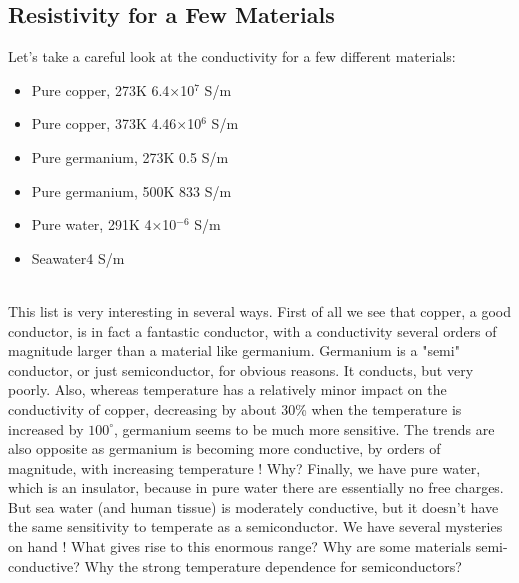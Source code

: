\subsection{Resistivity for a Few Materials}
Let's take a careful look at the conductivity for a few different materials:\\
\vspace{.5cm}
\begin{minipage}[c]{.55\textwidth}
\begin{itemize}
\item Pure copper, 273K \hfill 6.4×10$^{7}$ S/m
\item Pure copper, 373K \hfill 4.46×10$^{6}$ S/m
\item Pure germanium, 273K \hfill 0.5  S/m
\item Pure germanium, 500K \hfill 833 S/m
\item Pure water, 291K \hfill 4×10$^{-6}$ S/m
\item Seawater\hfill 4 S/m
\end{itemize} 
\end{minipage}
\vspace{.5cm}\\
This list is very interesting in several ways.  First of all we see that copper, a good conductor, is in fact a fantastic conductor, with a conductivity several orders of magnitude larger than a material like germanium.  Germanium is a "semi" conductor, or just semiconductor, for obvious reasons.  It conducts, but very poorly.  Also, whereas temperature has a relatively minor impact on the conductivity of copper, decreasing by about 30\% when the temperature is increased by $100^\circ$, germanium seems to be much more sensitive.  The trends are also opposite as germanium is becoming more conductive, by orders of magnitude, with increasing temperature !  Why?
Finally, we have pure water, which is an insulator, because in pure water there are essentially no free charges.  But sea water (and human tissue) is moderately conductive, but it doesn't have the same sensitivity to temperate as a semiconductor.
We have several mysteries on hand !
What gives rise to this enormous range?
Why are some materials semi-conductive?
Why the strong temperature dependence for semiconductors?
